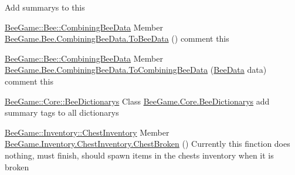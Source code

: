 
\begin{DoxyRefList}
\item[\label{todo__todo000001}%
\Hypertarget{todo__todo000001}%
Class \hyperlink{class_bee_game_1_1_bee_1_1_apiary}{Bee\+Game.Bee.Apiary} ]Add summarys to this 
\end{DoxyRefList}

\label{todo__todo000003}%
%
 \hyperlink{struct_bee_game_1_1_bee_1_1_combining_bee_data}{Bee\+Game\+::\+Bee\+::\+Combining\+Bee\+Data} Member \hyperlink{struct_bee_game_1_1_bee_1_1_combining_bee_data_a8f49452b4800bbc401a225e2676eeca0}{Bee\+Game.Bee.Combining\+Bee\+Data.To\+Bee\+Data} () comment this 

\label{todo__todo000002}%
%
 \hyperlink{struct_bee_game_1_1_bee_1_1_combining_bee_data}{Bee\+Game\+::\+Bee\+::\+Combining\+Bee\+Data} Member \hyperlink{struct_bee_game_1_1_bee_1_1_combining_bee_data_abdf4646728337da76097aed9b74347ae}{Bee\+Game.Bee.Combining\+Bee\+Data.To\+Combining\+Bee\+Data} (\hyperlink{struct_bee_game_1_1_bee_1_1_bee_data}{Bee\+Data} data) comment this 

\label{todo__todo000004}%
%
 \hyperlink{class_bee_game_1_1_core_1_1_bee_dictionarys}{Bee\+Game\+::\+Core\+::\+Bee\+Dictionarys} Class \hyperlink{class_bee_game_1_1_core_1_1_bee_dictionarys}{Bee\+Game.Core.Bee\+Dictionarys}  add summary tags to all dictionarys 

\label{todo__todo000005}%
%
 \hyperlink{class_bee_game_1_1_inventory_1_1_chest_inventory}{Bee\+Game\+::\+Inventory\+::\+Chest\+Inventory} Member \hyperlink{class_bee_game_1_1_inventory_1_1_chest_inventory_a9d38ab66a63c4d54bbba631e267a7149}{Bee\+Game.Inventory.Chest\+Inventory.Chest\+Broken} () Currently this finction does nothing, must finish, should spawn items in the chests inventory when it is broken 